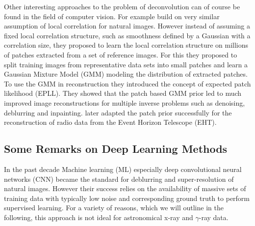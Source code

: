 \documentclass[twocolumn]{aastex631}
\newcommand{\gammaray}{$\gamma$-ray\xspace}
\newcommand{\todo}[1]{\textcolor{red}{TODO: #1}\PackageWarning{TODO:}{#1!}}
\begin{document}
    Other interesting approaches to the problem of deconvolution can of course be found in the field of computer vision. For example \cite{Zoran2011} build on very similar assumption of local correlation for natural images. However instead of assuming a fixed local correlation structure, such as smoothness defined by a Gaussian with a correlation size, they proposed to learn the local correlation structure on millions of patches extracted from a set of reference images. For this they proposed to split training images from representative data sets into small patches and learn a  Gaussian Mixture Model (GMM) modeling the distribution of extracted patches. To use the GMM in reconstruction they introduced the concept of expected patch likelihood (EPLL). They showed that the patch based GMM prior led to much improved image reconstructions for multiple inverse problems such as denoising, deblurring and inpainting. \cite{Bouman2016} later adapted the patch prior successfully for the reconstruction of radio data from the Event Horizon Telescope (EHT).
    
    

    \subsection{Some Remarks on Deep Learning Methods}
    In the past decade Machine learning (ML) especially deep convolutional neural networks (CNN) became the standard for deblurring and super-resolution of natural images. However their success relies on the availability of massive sets of training data with typically low noise and corresponding ground truth to perform supervised learning. For a variety of reasons, which we will outline in the following, this approach is not ideal for astronomical x-ray and \gammaray data.
    
\end{document}
